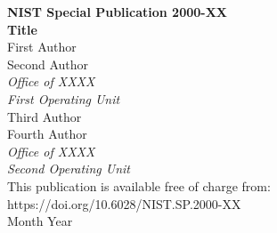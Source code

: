 \documentclass[12pt]{article}
\newcommand{\pubnumber}{2000-XX}
\newcommand{\DOI}{https://doi.org/10.6028/NIST.SP.2000-XX}
\newcommand{\monthyear}{Month Year}
\begin{document}
\begin{titlepage}
\begin{flushright}
\LARGE{\textbf{NIST Special Publication \pubnumber}}\\
\vfill 
\Huge{\textbf{Title}}\\
\vfill
\normalsize First Author\\
Second Author\\
\textit{Office of XXXX}\\
\textit{First Operating Unit}\\
\vspace{12pt}
Third Author\\
Fourth Author\\
\textit{Office of XXXX}\\
\textit{Second Operating Unit}\\
\vfill
\normalsize This publication is available free of charge from:\\
\DOI\\
\vfill
\normalsize \monthyear
\vfill


\end{flushright}
\end{titlepage}
\end{document}
